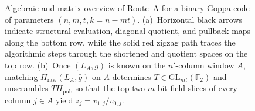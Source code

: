 \documentclass[11pt,a4paper]{article}
\theoremstyle{definition}
\theoremstyle{remark}
\newcommand{\F}{\mathbb{F}}
\begin{document}
\begin{figure}[t]
\caption{Algebraic and matrix overview of Route~A for a binary Goppa code of parameters $(n, m, t, k = n - mt)$. (a)~Horizontal black arrows indicate structural evaluation, diagonal-quotient, and pullback maps along the bottom row, while the solid red zigzag path traces the algorithmic steps through the shortened and quotient spaces on the top row. (b)~Once $(L_A, \bar{g})$ is known on the $n'$-column window $A$, matching $H_{\text{raw}}(L_A, \bar{g})$ on $A$ determines $T \in \mathrm{GL}_{mt}(\F_2)$ and unscrambles $T H_{\text{pub}}$ so that the top two $m$-bit field slices of every column $j \in \bar{A}$ yield $z_j = v_{1, j} / v_{0, j}$.}
\label{fig:walkthrough-pipeline}
\end{figure}
\end{document}
